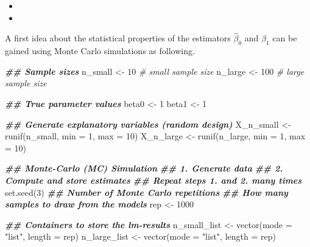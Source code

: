 \documentclass[
  14pt,
]{memoir}
\newenvironment{Shaded}{\begin{snugshade}}{\end{snugshade}}
\newcommand{\AttributeTok}[1]{\textcolor[rgb]{0.77,0.63,0.00}{#1}}
\newcommand{\CommentTok}[1]{\textcolor[rgb]{0.56,0.35,0.01}{\textit{#1}}}
\newcommand{\DecValTok}[1]{\textcolor[rgb]{0.00,0.00,0.81}{#1}}
\newcommand{\DocumentationTok}[1]{\textcolor[rgb]{0.56,0.35,0.01}{\textbf{\textit{#1}}}}
\newcommand{\FunctionTok}[1]{\textcolor[rgb]{0.00,0.00,0.00}{#1}}
\newcommand{\NormalTok}[1]{#1}
\newcommand{\OtherTok}[1]{\textcolor[rgb]{0.56,0.35,0.01}{#1}}
\newcommand{\StringTok}[1]{\textcolor[rgb]{0.31,0.60,0.02}{#1}}
\begin{document}
\begin{itemize}
\item {}  
\item {} 
\end{itemize}

A first idea about the statistical properties of the estimators \(\hat{\beta}_0\) and \(\hat{\beta}_1\) can be gained using Monte Carlo simulations as following.

\begin{Shaded}
\begin{Highlighting}[]
\DocumentationTok{\#\# Sample sizes}
\NormalTok{n\_small      }\OtherTok{\textless{}{-}}  \DecValTok{10} \CommentTok{\# small sample size}
\NormalTok{n\_large      }\OtherTok{\textless{}{-}} \DecValTok{100} \CommentTok{\# large sample size}

\DocumentationTok{\#\# True parameter values}
\NormalTok{beta0 }\OtherTok{\textless{}{-}} \DecValTok{1}
\NormalTok{beta1 }\OtherTok{\textless{}{-}} \DecValTok{1}

\DocumentationTok{\#\# Generate explanatory variables (random design)}
\NormalTok{X\_n\_small  }\OtherTok{\textless{}{-}} \FunctionTok{runif}\NormalTok{(n\_small, }\AttributeTok{min =} \DecValTok{1}\NormalTok{, }\AttributeTok{max =} \DecValTok{10}\NormalTok{)}
\NormalTok{X\_n\_large  }\OtherTok{\textless{}{-}} \FunctionTok{runif}\NormalTok{(n\_large, }\AttributeTok{min =} \DecValTok{1}\NormalTok{, }\AttributeTok{max =} \DecValTok{10}\NormalTok{)}

\DocumentationTok{\#\# Monte{-}Carlo (MC) Simulation }
\DocumentationTok{\#\# 1. Generate data}
\DocumentationTok{\#\# 2. Compute and store estimates}
\DocumentationTok{\#\# Repeat steps 1. and 2. many times}
\FunctionTok{set.seed}\NormalTok{(}\DecValTok{3}\NormalTok{)}
\DocumentationTok{\#\# Number of Monte Carlo repetitions}
\DocumentationTok{\#\# How many samples to draw from the models}
\NormalTok{rep          }\OtherTok{\textless{}{-}} \DecValTok{1000}

\DocumentationTok{\#\# Containers to store the lm{-}results}
\NormalTok{n\_small\_list }\OtherTok{\textless{}{-}} \FunctionTok{vector}\NormalTok{(}\AttributeTok{mode =} \StringTok{"list"}\NormalTok{, }\AttributeTok{length =}\NormalTok{ rep)}
\NormalTok{n\_large\_list }\OtherTok{\textless{}{-}} \FunctionTok{vector}\NormalTok{(}\AttributeTok{mode =} \StringTok{"list"}\NormalTok{, }\AttributeTok{length =}\NormalTok{ rep)}


\end{Highlighting}
\end{Shaded}
\end{document}
